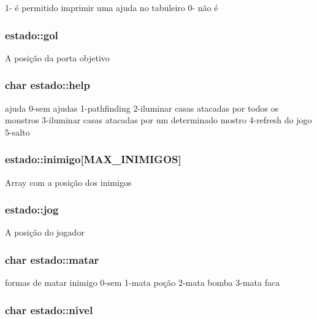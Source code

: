 1-\/ é permitido imprimir uma ajuda no tabuleiro 0-\/ não é \hypertarget{structestado_a263fcce8335baa7ccdff318a22816891}{
\subsubsection[{gol}]{ estado\+::gol}}\label{structestado_a263fcce8335baa7ccdff318a22816891}
A posição da porta objetivo \hypertarget{structestado_a5ffbd63e69caa4229f7541d67b89138b}{
\subsubsection[{help}]{\setlength{\rightskip}{0pt plus 5cm}char estado\+::help}}\label{structestado_a5ffbd63e69caa4229f7541d67b89138b}
ajuda 0-\/sem ajudas 1-\/pathfinding 2-\/iluminar casas atacadas por todos os monstros 3-\/iluminar casas atacadas por um determinado mostro 4-\/refresh do jogo 5-\/salto \hypertarget{structestado_a8f7d47deb337ae082beab6a574ace9e3}{
\subsubsection[{inimigo}]{ estado\+::inimigo\mbox{[}{\bf M\+A\+X\+\_\+\+I\+N\+I\+M\+I\+G\+O\+S}\mbox{]}}}\label{structestado_a8f7d47deb337ae082beab6a574ace9e3}
Array com a posição dos inimigos \hypertarget{structestado_abf55d0d40aafdd6829efbc8265b4f724}{
\subsubsection[{jog}]{ estado\+::jog}}\label{structestado_abf55d0d40aafdd6829efbc8265b4f724}
A posição do jogador \hypertarget{structestado_a7254bdd4f0f4001a6143eb5b1220f62c}{
\subsubsection[{matar}]{\setlength{\rightskip}{0pt plus 5cm}char estado\+::matar}}\label{structestado_a7254bdd4f0f4001a6143eb5b1220f62c}
formas de matar inimigo 0-\/sem 1-\/mata poção 2-\/mata bomba 3-\/mata faca \hypertarget{structestado_a620f2f81ebfe4cba1d6e44b09a1762f7}{
\subsubsection[{nivel}]{\setlength{\rightskip}{0pt plus 5cm}char estado\+::nivel}}\label{structestado_a620f2f81ebfe4cba1d6e44b09a1762f7}
